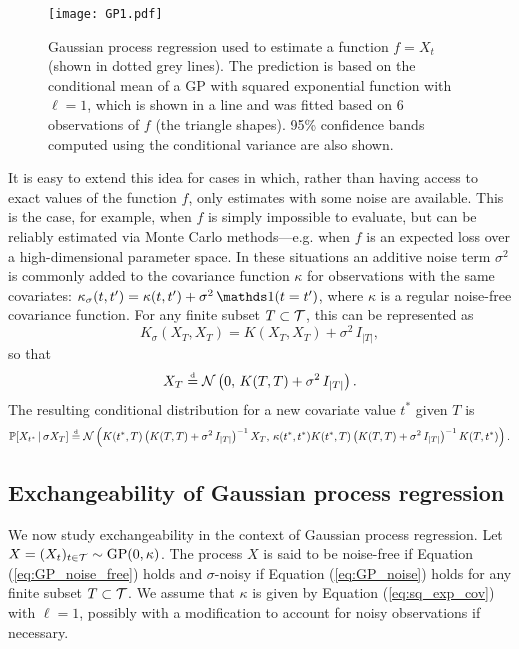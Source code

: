 \begin{figure}[h]
	\centering
	\texttt{[image: GP1.pdf]}
	\caption{Gaussian process regression used to estimate a function $f = X_t$ (shown in dotted grey lines). The prediction is based on the conditional mean of a GP with squared exponential function with $\ell=1$, which is shown in a line and was fitted based on 6 observations of $f$ (the triangle shapes). 95\% confidence bands computed using the conditional variance are also shown.}
	\label{fig:GP1}
\end{figure}



It is easy to extend this idea for cases in which, rather than having access to exact values of the function $f$, only estimates with some noise are available. This is the case, for example, when $f$ is simply impossible to evaluate, but can be reliably estimated via Monte Carlo methods---e.g. when $f$ is an expected loss over a high-dimensional parameter space. In these situations an additive noise term $\sigma^2$ is commonly added to the covariance function $\kappa$ for observations with the same covariates: $\kappa_{\sigma} (t, t') = \kappa(t, t') + \sigma^2 \, \indicator (t = t')$, where $\kappa$ is a regular noise-free covariance function. For any finite subset $T \subset \mathcal{T}$, this can be represented as
\begin{equation*}
	K_{\sigma} (X_T, X_T) = K(X_T, X_T) + \sigma^2 \, I_{|T|},
\end{equation*}
so that
\begin{equation} \label{eq:GP_noise}
	X_T \stackrel{\text{\rm\tiny d}}{=} \mathcal{N} \left( 0, \, K(T, T) + \sigma^2 \, I_{|T|} \right).
\end{equation}
The resulting conditional distribution for a new covariate value $t^{*}$ given $T$ is
\begin{equation*}
 \mathbb{P} [X_{t^{*}} \,| \, \sigma X_T ] \stackrel{\text{\rm\tiny d}}{=} \mathcal{N} \left( K(t^{*}, T) \left( K(T, T) + \sigma^2 \, I_{|T|} \right)^{-1} X_T, \, \kappa(t^{*}, t^{*}) K(t^{*}, T) \left( K(T, T) + \sigma^2 \, I_{|T|} \right)^{-1} K(T, t^{*})  \right).
\end{equation*}



\subsection{Exchangeability of Gaussian process regression}


We now study exchangeability in the context of Gaussian process regression. Let $X = (X_t)_{t \in \mathcal{T}} \sim \mathrm{GP} (0, \kappa)$. The process $X$ is said to be noise-free if Equation (\ref{eq:GP_noise_free}) holds and $\sigma$-noisy if Equation (\ref{eq:GP_noise}) holds for any finite subset $T \subset \mathcal{T}$. We assume that $\kappa$ is given by Equation (\ref{eq:sq_exp_cov}) with $\ell = 1$, possibly with a modification to account for noisy observations if necessary.



